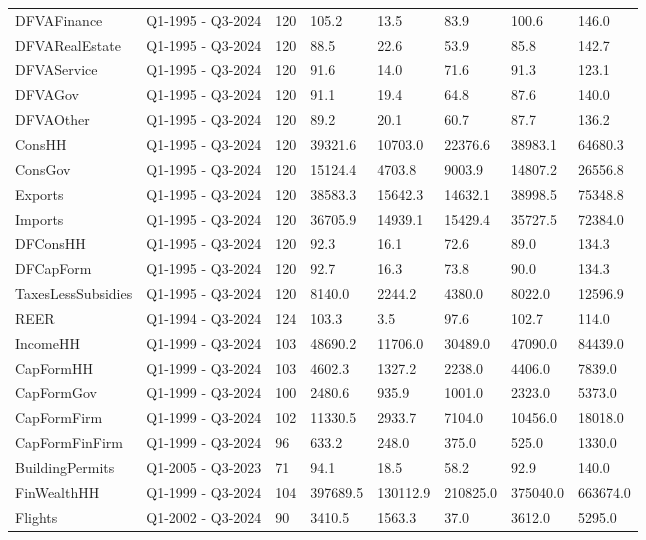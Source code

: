 \begin{longtable}[t]{llllllll}
DFVAFinance & Q1-1995 - Q3-2024 & 120 & 105.2 & 13.5 & 83.9 & 100.6 & 146.0\\
\addlinespace
DFVARealEstate & Q1-1995 - Q3-2024 & 120 & 88.5 & 22.6 & 53.9 & 85.8 & 142.7\\
DFVAService & Q1-1995 - Q3-2024 & 120 & 91.6 & 14.0 & 71.6 & 91.3 & 123.1\\
DFVAGov & Q1-1995 - Q3-2024 & 120 & 91.1 & 19.4 & 64.8 & 87.6 & 140.0\\
DFVAOther & Q1-1995 - Q3-2024 & 120 & 89.2 & 20.1 & 60.7 & 87.7 & 136.2\\
ConsHH & Q1-1995 - Q3-2024 & 120 & 39321.6 & 10703.0 & 22376.6 & 38983.1 & 64680.3\\
\addlinespace
ConsGov & Q1-1995 - Q3-2024 & 120 & 15124.4 & 4703.8 & 9003.9 & 14807.2 & 26556.8\\
Exports & Q1-1995 - Q3-2024 & 120 & 38583.3 & 15642.3 & 14632.1 & 38998.5 & 75348.8\\
Imports & Q1-1995 - Q3-2024 & 120 & 36705.9 & 14939.1 & 15429.4 & 35727.5 & 72384.0\\
DFConsHH & Q1-1995 - Q3-2024 & 120 & 92.3 & 16.1 & 72.6 & 89.0 & 134.3\\
DFCapForm & Q1-1995 - Q3-2024 & 120 & 92.7 & 16.3 & 73.8 & 90.0 & 134.3\\
\addlinespace
TaxesLessSubsidies & Q1-1995 - Q3-2024 & 120 & 8140.0 & 2244.2 & 4380.0 & 8022.0 & 12596.9\\
REER & Q1-1994 - Q3-2024 & 124 & 103.3 & 3.5 & 97.6 & 102.7 & 114.0\\
IncomeHH & Q1-1999 - Q3-2024 & 103 & 48690.2 & 11706.0 & 30489.0 & 47090.0 & 84439.0\\
CapFormHH & Q1-1999 - Q3-2024 & 103 & 4602.3 & 1327.2 & 2238.0 & 4406.0 & 7839.0\\
CapFormGov & Q1-1999 - Q3-2024 & 100 & 2480.6 & 935.9 & 1001.0 & 2323.0 & 5373.0\\
\addlinespace
CapFormFirm & Q1-1999 - Q3-2024 & 102 & 11330.5 & 2933.7 & 7104.0 & 10456.0 & 18018.0\\
CapFormFinFirm & Q1-1999 - Q3-2024 & 96 & 633.2 & 248.0 & 375.0 & 525.0 & 1330.0\\
BuildingPermits & Q1-2005 - Q3-2023 & 71 & 94.1 & 18.5 & 58.2 & 92.9 & 140.0\\
FinWealthHH & Q1-1999 - Q3-2024 & 104 & 397689.5 & 130112.9 & 210825.0 & 375040.0 & 663674.0\\
Flights & Q1-2002 - Q3-2024 & 90 & 3410.5 & 1563.3 & 37.0 & 3612.0 & 5295.0\\

\end{longtable}

